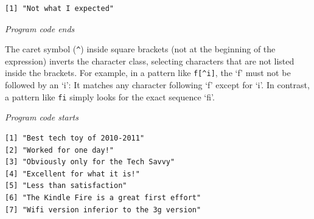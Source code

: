 \begin{Shaded}
\begin{Highlighting}[]
\NormalTok{(} \NormalTok{)}
\end{Highlighting}
\end{Shaded}

\begin{verbatim}
[1] "Not what I expected"
\end{verbatim}

\emph{Program code ends}

The caret symbol (\texttt{\^{}}) inside square brackets (not at the
beginning of the expression) inverts the character class, selecting
characters that are not listed inside the brackets. For example, in a
pattern like \texttt{f{[}\^{}i{]}}, the `f' must not be followed by an
`i': It matches any character following `f' except for `i'. In contrast,
a pattern like \texttt{fi} simply looks for the exact sequence `fi'.

\emph{Program code starts}

\begin{Shaded}
\begin{Highlighting}[]
\NormalTok{(} \NormalTok{)}
\end{Highlighting}
\end{Shaded}

\begin{verbatim}
[1] "Best tech toy of 2010-2011"             
[2] "Worked for one day!"                    
[3] "Obviously only for the Tech Savvy"      
[4] "Excellent for what it is!"              
[5] "Less than satisfaction"                 
[6] "The Kindle Fire is a great first effort"
[7] "Wifi version inferior to the 3g version"
\end{verbatim}

\begin{Shaded}
\begin{Highlighting}[]
\NormalTok{(} \NormalTok{)}
\end{Highlighting}
\end{Shaded}

